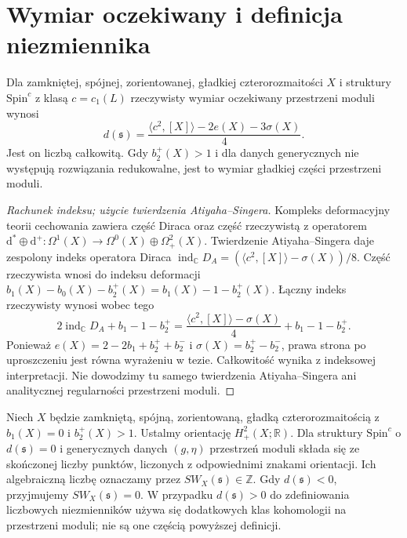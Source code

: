 \section{Wymiar oczekiwany i definicja niezmiennika}
\label{sec:tg-sw-dimension}

\begin{twierdzenie}
\label{thm:tg-sw-dimension}
Dla zamkniętej, spójnej, zorientowanej,
gładkiej czterorozmaitości $X$ i struktury
$\mathrm{Spin}^c$ z klasą $c=c_1(L)$ rzeczywisty
wymiar oczekiwany przestrzeni moduli wynosi
\[
d(\mathfrak s)=\frac{\langle c^2,[X]\rangle-2e(X)-3\sigma(X)}4.
\]
Jest on liczbą całkowitą. Gdy $b_2^+(X)>1$ i dla danych
generycznych nie występują rozwiązania redukowalne,
jest to wymiar gładkiej części przestrzeni moduli.
\end{twierdzenie}

\begin{proof}[Rachunek indeksu; użycie twierdzenia Atiyaha--Singera]
Kompleks deformacyjny teorii cechowania zawiera część
Diraca oraz część rzeczywistą z operatorem
$\mathrm d^*\oplus\mathrm d^+:\Omega^1(X)\to
\Omega^0(X)\oplus\Omega^2_+(X)$.
Twierdzenie Atiyaha--Singera daje zespolony indeks operatora
Diraca $\operatorname{ind}_{\mathbb C}D_A
=(\langle c^2,[X]\rangle-\sigma(X))/8$.
Część rzeczywista wnosi do indeksu deformacji
$b_1(X)-b_0(X)-b_2^+(X)=b_1(X)-1-b_2^+(X)$.
Łączny indeks rzeczywisty wynosi wobec tego
\[
2\operatorname{ind}_{\mathbb C}D_A+b_1-1-b_2^+
=\frac{\langle c^2,[X]\rangle-\sigma(X)}4+b_1-1-b_2^+.
\]
Ponieważ $e(X)=2-2b_1+b_2^++b_2^-$ i
$\sigma(X)=b_2^+-b_2^-$, prawa strona po uproszczeniu
jest równa wyrażeniu w tezie.
Całkowitość wynika z indeksowej interpretacji.
Nie dowodzimy tu samego twierdzenia Atiyaha--Singera ani
analitycznej regularności przestrzeni moduli.
\end{proof}

\begin{definicja}
Niech $X$ będzie zamkniętą, spójną, zorientowaną,
gładką czterorozmaitością z $b_1(X)=0$ i $b_2^+(X)>1$.
Ustalmy orientację $H^2_+(X;\mathbb R)$.
Dla struktury $\mathrm{Spin}^c$ o $d(\mathfrak s)=0$
i generycznych danych $(g,\eta)$ przestrzeń moduli
składa się ze skończonej liczby punktów, liczonych
z odpowiednimi znakami orientacji. Ich algebraiczną
liczbę oznaczamy przez $SW_X(\mathfrak s)\in\mathbb Z$.
Gdy $d(\mathfrak s)<0$, przyjmujemy $SW_X(\mathfrak s)=0$.
W przypadku $d(\mathfrak s)>0$ do zdefiniowania
liczbowych niezmienników używa się dodatkowych klas
kohomologii na przestrzeni moduli; nie są one częścią
powyższej definicji.
\end{definicja}

